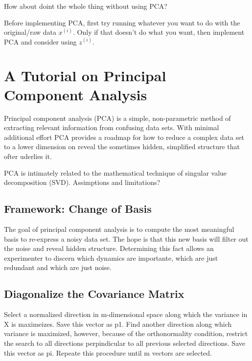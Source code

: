 How about doint the whole thing without using PCA?

Before implementing PCA, first try running whatever you want to do with
the original/raw data \(x^{(i)}\). Only if that doesn't do what you
want, then implement PCA and consider using \(z^{(i)}\).

\hypertarget{a-tutorial-on-principal-component-analysis}{%
\section{A Tutorial on Principal Component
Analysis}\label{a-tutorial-on-principal-component-analysis}}

\cite{shlens2014tutorial}

Principal component analysis (PCA) is a simple, non-parametric method of
extracting relevant information from confusing data sets. With minimal
additional effort PCA provides a roadmap for how to reduce a complex
data set to a lower dimension on reveal the sometimes hidden, simplified
structure that ofter uderlies it.

PCA is intimately related to the mathematical technique of singular
value decomposition (SVD). Assimptions and limitations?

\hypertarget{framework-change-of-basis}{%
\subsection{Framework: Change of
Basis}\label{framework-change-of-basis}}

The goal of principal component analysis is to compute the most
meaningful basis to re-express a noisy data set. The hope is that this
new basis will filter out the noise and reveal hidden structure.
Determining this fact allows an experimenter to discern which dynamics
are importante, which are just redundant and which are just noise.

\hypertarget{diagonalize-the-covariance-matrix}{%
\subsection{Diagonalize the Covariance
Matrix}\label{diagonalize-the-covariance-matrix}}

Select a normalized direction in m-dimensional space along which the
variance in X is maximeizes. Save this vector as p1. Find another
direction along which variance is maximized, however, because of the
orthonormality condition, restrict the search to all directions
perpindicular to all previous selected directions. Save this vector as
pi. Repeate this procedure until m vectors are selected.

